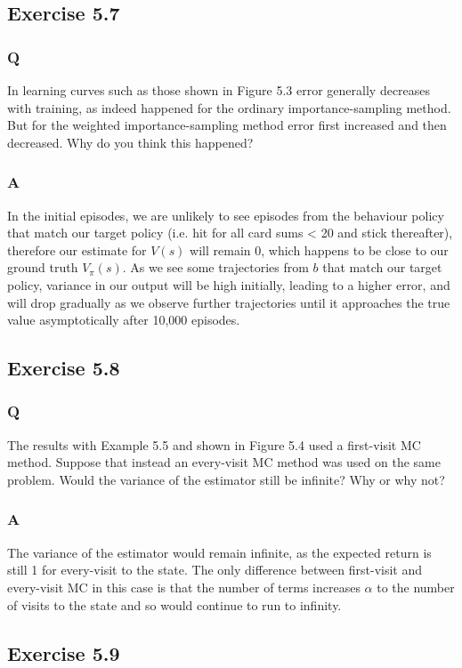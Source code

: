 \subsection{Exercise 5.7}
\subsubsection{Q}
In learning curves such as those shown in Figure 5.3 error generally decreases with training, as indeed happened for the ordinary importance-sampling method. But for the weighted importance-sampling method error first increased and then decreased. Why do you think this happened?
\subsubsection{A}
In the initial episodes, we are unlikely to see episodes from the behaviour policy that match our target policy (i.e. hit for all card sums < 20 and stick thereafter), therefore our estimate for $V(s)$ will remain 0, which happens to be close to our ground truth $V_\pi(s)$. As we see some trajectories from $b$ that match our target policy, variance in our output will be high initially, leading to a higher error, and will drop gradually as we observe further trajectories until it approaches the true value asymptotically after 10,000 episodes.

\subsection{Exercise 5.8}
\subsubsection{Q}
The results with Example 5.5 and shown in Figure 5.4 used a first-visit MC method. Suppose that instead an every-visit MC method was used on the same problem. Would the variance of the estimator still be infinite? Why or why not?
\subsubsection{A}
The variance of the estimator would remain infinite, as the expected return is still 1 for every-visit to the state. The only difference between first-visit and every-visit MC in this case is that the number of terms increases $\alpha$ to the number of visits to the state and so would continue to run to infinity.

\subsection{Exercise 5.9}
